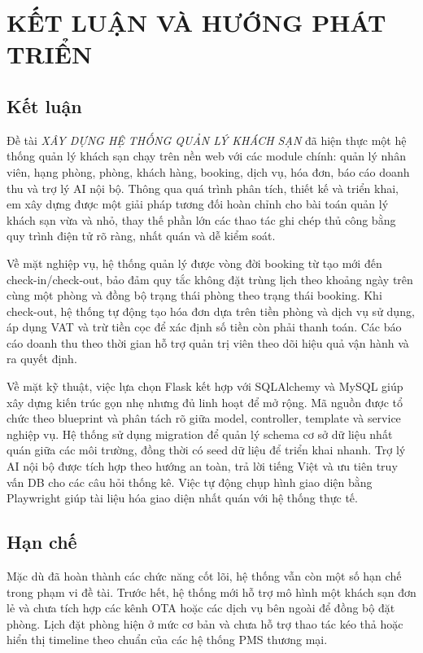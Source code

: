 \documentclass[13pt,a4paper]{extreport}
\newcommand{\TenDeTai}{XÂY DỰNG HỆ THỐNG QUẢN LÝ KHÁCH SẠN}
\begin{document}
\chapter{KẾT LUẬN VÀ HƯỚNG PHÁT TRIỂN}

\section{Kết luận}

Đề tài \emph{\TenDeTai} đã hiện thực một hệ thống quản lý khách sạn chạy trên nền web với các module chính: quản lý nhân viên, hạng phòng, phòng, khách hàng, booking, dịch vụ, hóa đơn, báo cáo doanh thu và trợ lý AI nội bộ. Thông qua quá trình phân tích, thiết kế và triển khai, em xây dựng được một giải pháp tương đối hoàn chỉnh cho bài toán quản lý khách sạn vừa và nhỏ, thay thế phần lớn các thao tác ghi chép thủ công bằng quy trình điện tử rõ ràng, nhất quán và dễ kiểm soát.

Về mặt nghiệp vụ, hệ thống quản lý được vòng đời booking từ tạo mới đến check-in/check-out, bảo đảm quy tắc không đặt trùng lịch theo khoảng ngày trên cùng một phòng và đồng bộ trạng thái phòng theo trạng thái booking. Khi check-out, hệ thống tự động tạo hóa đơn dựa trên tiền phòng và dịch vụ sử dụng, áp dụng VAT và trừ tiền cọc để xác định số tiền còn phải thanh toán. Các báo cáo doanh thu theo thời gian hỗ trợ quản trị viên theo dõi hiệu quả vận hành và ra quyết định.

Về mặt kỹ thuật, việc lựa chọn Flask kết hợp với SQLAlchemy và MySQL giúp xây dựng kiến trúc gọn nhẹ nhưng đủ linh hoạt để mở rộng. Mã nguồn được tổ chức theo blueprint và phân tách rõ giữa model, controller, template và service nghiệp vụ. Hệ thống sử dụng migration để quản lý schema cơ sở dữ liệu nhất quán giữa các môi trường, đồng thời có seed dữ liệu để triển khai nhanh. Trợ lý AI nội bộ được tích hợp theo hướng an toàn, trả lời tiếng Việt và ưu tiên truy vấn DB cho các câu hỏi thống kê. Việc tự động chụp hình giao diện bằng Playwright giúp tài liệu hóa giao diện nhất quán với hệ thống thực tế.

\section{Hạn chế}

Mặc dù đã hoàn thành các chức năng cốt lõi, hệ thống vẫn còn một số hạn chế trong phạm vi đề tài. Trước hết, hệ thống mới hỗ trợ mô hình một khách sạn đơn lẻ và chưa tích hợp các kênh OTA hoặc các dịch vụ bên ngoài để đồng bộ đặt phòng. Lịch đặt phòng hiện ở mức cơ bản và chưa hỗ trợ thao tác kéo thả hoặc hiển thị timeline theo chuẩn của các hệ thống PMS thương mại.
\end{document}
